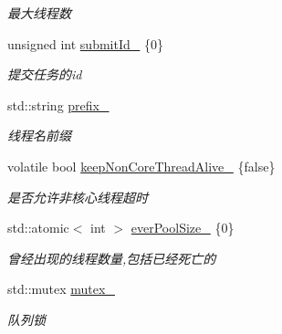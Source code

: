 \begin{DoxyCompactItemize}
\begin{DoxyCompactList}\small\item\em 最大线程数 \end{DoxyCompactList}\item 
\mbox{\label{classThreadPoolExecutor_a32da434f74911bcc1702eaafabfac368}} 
unsigned int \hyperlink{classThreadPoolExecutor_a32da434f74911bcc1702eaafabfac368}{submit\+Id\+\_\+} \{0\}
\begin{DoxyCompactList}\small\item\em 提交任务的id \end{DoxyCompactList}\item 
\mbox{\label{classThreadPoolExecutor_acf28232c8314da96403992137fdd1c2f}} 
std\+::string \hyperlink{classThreadPoolExecutor_acf28232c8314da96403992137fdd1c2f}{prefix\+\_\+}
\begin{DoxyCompactList}\small\item\em 线程名前缀 \end{DoxyCompactList}\item 
\mbox{\label{classThreadPoolExecutor_a2c8fc052c3760c89bf5198409d8c9c72}} 
volatile bool \hyperlink{classThreadPoolExecutor_a2c8fc052c3760c89bf5198409d8c9c72}{keep\+Non\+Core\+Thread\+Alive\+\_\+} \{false\}
\begin{DoxyCompactList}\small\item\em 是否允许非核心线程超时 \end{DoxyCompactList}\item 
\mbox{\label{classThreadPoolExecutor_ad8f4e68f28d617749537036f6e688b8c}} 
std\+::atomic$<$ int $>$ \hyperlink{classThreadPoolExecutor_ad8f4e68f28d617749537036f6e688b8c}{ever\+Pool\+Size\+\_\+} \{0\}
\begin{DoxyCompactList}\small\item\em 曾经出现的线程数量,包括已经死亡的 \end{DoxyCompactList}\item 
\mbox{\label{classThreadPoolExecutor_a2ef0eea2a8ca7a03bd9d361ced31f71b}} 
std\+::mutex \hyperlink{classThreadPoolExecutor_a2ef0eea2a8ca7a03bd9d361ced31f71b}{mutex\+\_\+}
\begin{DoxyCompactList}\small\item\em 队列锁 \end{DoxyCompactList}\item 

\end{DoxyCompactItemize}
